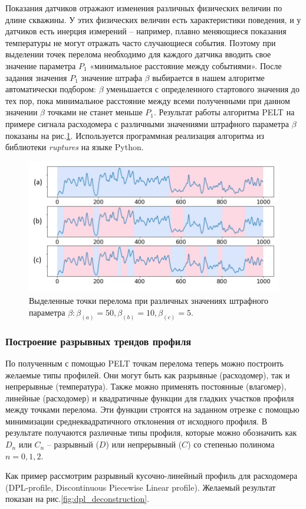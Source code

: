\par
Показания датчиков отражают изменения различных физических величин по длине скважины. У этих физических величин есть характеристики поведения, и у датчиков есть инерция измерений – например, плавно меняющиеся показания температуры не могут отражать часто случающиеся события. Поэтому при выделении точек перелома необходимо для каждого датчика вводить свое значение параметра $P_1$ «минимальное расстояние между событиями». После задания значения $P_1$ значение штрафа $\beta$ выбирается в нашем алгоритме автоматически подбором: $\beta$ уменьшается с определенного стартового значения до тех пор, пока минимальное расстояние между всеми полученными при данном значении $\beta$ точками не станет меньше $P_1$.
Результат работы алгоритма PELT на примере сигнала расходомера с различными значениями штрафного параметра $\beta$ показаны на рис.\ref{fig:pelt}. Используется программная реализация алгоритма из библиотеки \textit{ruptures} на языке Python.

\begin{figure}[H]
\centering
\includegraphics[width=1\textwidth]{PLT/pelt.png}
\caption{Выделенные точки перелома при различных значениях штрафного параметра $\beta: \beta_{(a)}=50, \beta_{(b)}=10, \beta_{(c)}=5$.}
\label{fig:pelt}
\end{figure}

\subsubsection{Построение разрывных трендов профиля}
\par
По полученным с помощью PELT точкам перелома теперь можно построить желаемые типы профилей. Они могут быть как разрывные (расходомер), так и непрерывные (температура). Также можно применять постоянные (влагомер), линейные (расходомер) и квадратичные функции для гладких участков профиля между точками перелома. Эти функции строятся на заданном отрезке с помощью минимизации среднеквадратичного отклонения от исходного профиля. В результате получаются различные типы профиля, которые можно обозначить как $D_n$ или $C_n$ – разрывный ($D$) или непрерывный ($C$) со степенью полинома $n=0,1,2$.
\par
Как пример рассмотрим разрывный кусочно-линейный профиль для расходомера (DPL-profile, Discontinuous Piecewise Linear profile). Желаемый результат показан на рис.\ref{fig:dpl_deconstruction}.

